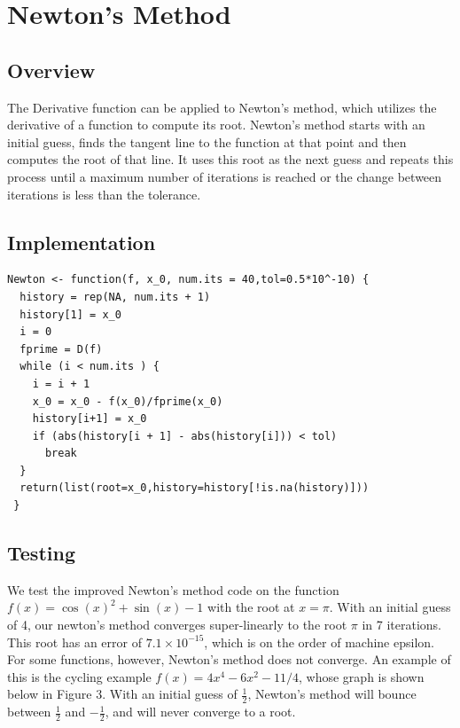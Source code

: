 \documentclass{article}
\begin{document}
\section{Newton's Method}

\subsection{Overview}

The Derivative function can be applied to Newton's method, which utilizes the derivative of a function to compute its root. Newton's method starts with an initial guess, finds the tangent line to the function at that point and then computes the root of that line. It uses this root as the next guess and repeats this process until a maximum number of iterations is reached or the change between iterations is less than the tolerance.

\subsection{Implementation}

\begin{lstlisting}
Newton <- function(f, x_0, num.its = 40,tol=0.5*10^-10) {
  history = rep(NA, num.its + 1)
  history[1] = x_0
  i = 0
  fprime = D(f)
  while (i < num.its ) {
    i = i + 1
    x_0 = x_0 - f(x_0)/fprime(x_0)
    history[i+1] = x_0
    if (abs(history[i + 1] - abs(history[i])) < tol)
      break
  }
  return(list(root=x_0,history=history[!is.na(history)]))
 }
\end{lstlisting}

\subsection{Testing}
We test the improved Newton's method code on the function $f(x) = \cos(x)^2 + \sin(x) - 1$ with the root at $ x = \pi$. With an initial guess of 4, our newton's method converges super-linearly to the root $\pi$ in 7 iterations. This root has an error of $7.1 \times 10^{-15}$, which is on the order of machine epsilon. \\

\noindent For some functions, however, Newton's method does not converge. An example of this is the cycling example $f(x) = 4x^4 - 6x^2 - 11/4$, whose graph is shown below in Figure 3. With an initial guess of $\frac{1}{2}$, Newton's method will bounce between $\frac{1}{2}$ and $-\frac{1}{2}$, and will never converge to a root.
\end{document}
